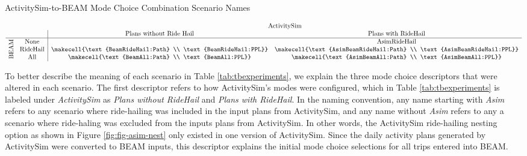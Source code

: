 \documentclass[fancy, masters]{byuthesis}
\begin{document}
\begin{table}
\caption{ActivitySim-to-BEAM Mode Choice Combination Scenario Names}
\renewcommand{\arraystretch}{2}
\[
  \begin{array}{cc|ccc}
    &\multicolumn{1}{c}{} & \multicolumn{2}{c}{\text{ActivitySim}} \\
    && \text{Plans without Ride Hail} & \text{Plans with RideHail}\\
    \hline
    & \text{None} & \text{} & \text{AsimRideHail} \\
    \smash{\rotatebox[origin=c]{90}{\text{BEAM}}} & \text{RideHail} & \makecell{\text{BeamRideHail:Path} \\ \text{BeamRideHail:PPL}} & \makecell{\text{AsimBeamRideHail:Path} \\ \text{AsimBeamRideHail:PPL}} \\
    & \text{All} & \makecell{\text{BeamAll:Path} \\ \text{BeamAll:PPL}} & \makecell{\text{AsimBeamAll:Path} \\ \text{AsimBeamAll:PPL}}
  \end{array}
\]
\label{tab:tbexperiments}
\end{table}

To better describe the meaning of each scenario in Table \ref{tab:tbexperiments}, we explain the three mode choice descriptors that were altered in each scenario. The first descriptor refers to how ActivitySim's modes were configured, which in Table \ref{tab:tbexperiments} is labeled under \emph{ActivitySim} as \emph{Plans without RideHail} and \emph{Plans with RideHail}. In the naming convention, any name starting with \emph{Asim} refers to any scenario where ride-hailing was included in the input plans from ActivitySim, and any name without \emph{Asim} refers to any a scenario where ride-haling was excluded from the inputs plans from ActivitySim. In other words, the ActivitySim ride-hailing nesting option as shown in Figure \ref{fig:fig-asim-nest} only existed in one version of ActivitySim. Since the daily activity plans generated by ActivitySim were converted to BEAM inputs, this descriptor explains the initial mode choice selections for all trips entered into BEAM.
\end{document}
